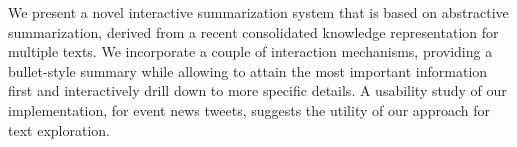We present a novel interactive summarization system that is based on abstractive summarization, derived from a recent consolidated knowledge representation for multiple texts. We incorporate a couple of interaction mechanisms, providing a bullet-style summary while allowing to attain the most important information first and interactively drill down to more specific details. A usability study of our implementation, for event news tweets, suggests the utility of our approach for text exploration.
